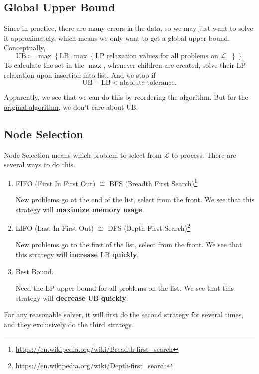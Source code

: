 \subsection{Global Upper Bound}
Since in practice, there are many errors in the data, so we may just want to solve it approximately, which means we only want to get a global upper bound.
Conceptually,
\[
	\mathrm{UB} \coloneqq \max\left\{\mathrm{LB}, \max\left\{\text{\(\mathrm{LP}\) relaxation values for all problems on \(\mathcal{L}\) }\right\}\right\}
\]
To calculate the set in the \(\max\), whenever children are created, solve their LP relaxation upon insertion into list. And we stop if
\[
	\mathrm{UB} - \mathrm{LB} < \text{absolute tolerance}.
\]

\begin{remark}
	Apparently, we see that we can do this by reordering the algorithm. But for the \hyperref[algo:branch-and-bound-algorithm]{original algorithm}, we don't care about \(\mathrm{UB}\).
\end{remark}

\subsection{Node Selection}\label{subsec:node-selection}
Node Selection means which problem to select from \(\mathcal{L} \) to process. There are several ways to do this.
\begin{enumerate}
	\item FIFO (First In First Out) \(\cong\) BFS (Breadth First Search)\footnote{\url{https://en.wikipedia.org/wiki/Breadth-first_search}}
	      \par New problems go at the end of the list, select from the front. We see that this strategy will \textbf{maximize memory usage}.
	\item LIFO (Last In First Out) \(\cong\) DFS (Depth First Search)\footnote{\url{https://en.wikipedia.org/wiki/Depth-first_search}}
	      \par New problems go to the first of the list, select from the front. We see that this strategy will \textbf{increase \(\mathrm{LB}\) quickly}.
	\item Best Bound.
	      \par Need the LP upper bound for all problems on the list. We see that this strategy will \textbf{decrease \(\mathrm{UB}\) quickly}.
\end{enumerate}

\begin{remark}
	For any reasonable solver, it will first do the second strategy for several times, and they exclusively do the third strategy.
\end{remark}

